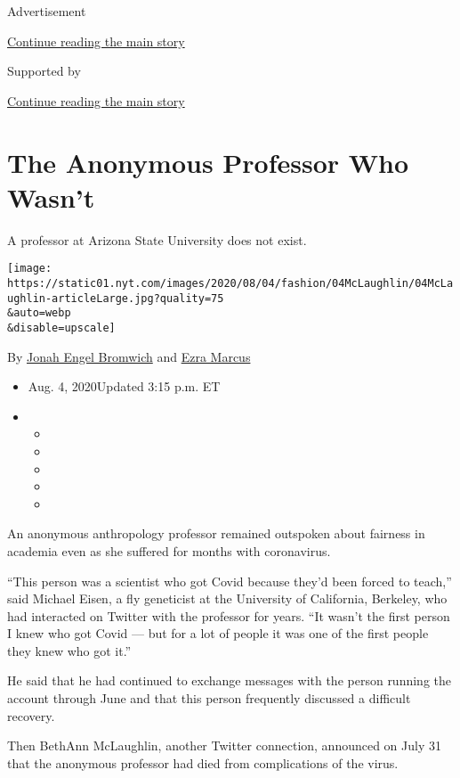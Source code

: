 Advertisement

\protect\hyperlink{after-top}{Continue reading the main story}

Supported by

\protect\hyperlink{after-sponsor}{Continue reading the main story}

\hypertarget{the-anonymous-professor-who-wasnt}{%
\section{The Anonymous Professor Who
Wasn't}\label{the-anonymous-professor-who-wasnt}}

A professor at Arizona State University does not exist.

\texttt{[image: https://static01.nyt.com/images/2020/08/04/fashion/04McLaughlin/04McLaughlin-articleLarge.jpg?quality=75\\\&auto=webp\\\&disable=upscale]}

By \href{https://www.nytimes.com/by/jonah-engel-bromwich}{Jonah Engel
Bromwich} and \href{https://www.nytimes.com/by/ezra-marcus}{Ezra Marcus}

\begin{itemize}
\item
  Aug. 4, 2020Updated 3:15 p.m. ET
\item
  \begin{itemize}
  \item
  \item
  \item
  \item
  \item
  \end{itemize}
\end{itemize}

An anonymous anthropology professor remained outspoken about fairness in
academia even as she suffered for months with coronavirus.

``This person was a scientist who got Covid because they'd been forced
to teach,'' said Michael Eisen, a fly geneticist at the University of
California, Berkeley, who had interacted on Twitter with the professor
for years. ``It wasn't the first person I knew who got Covid --- but for
a lot of people it was one of the first people they knew who got it.''

He said that he had continued to exchange messages with the person
running the account through June and that this person frequently
discussed a difficult recovery.

Then BethAnn McLaughlin, another Twitter connection, announced on July
31 that the anonymous professor had died from complications of the
virus.

